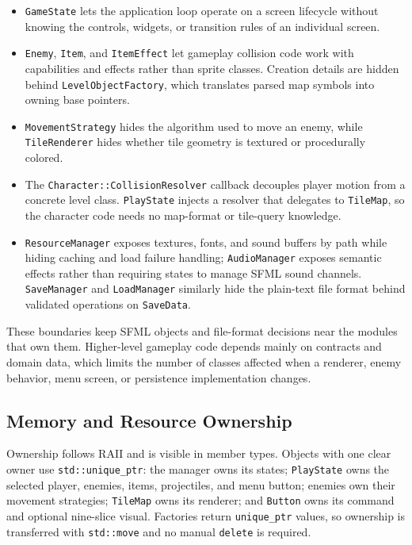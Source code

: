 \documentclass{template}
\begin{document}
\begin{itemize}
    \item \texttt{GameState} lets the application loop operate on a screen
          lifecycle without knowing the controls, widgets, or transition rules
          of an individual screen.
    \item \texttt{Enemy}, \texttt{Item}, and \texttt{ItemEffect} let gameplay
          collision code work with capabilities and effects rather than sprite
          classes. Creation details are hidden behind
          \texttt{LevelObjectFactory}, which translates parsed map symbols into
          owning base pointers.
    \item \texttt{MovementStrategy} hides the algorithm used to move an enemy,
          while \texttt{TileRenderer} hides whether tile geometry is textured
          or procedurally colored.
    \item The \texttt{Character::CollisionResolver} callback decouples player
          motion from a concrete level class. \texttt{PlayState} injects a
          resolver that delegates to \texttt{TileMap}, so the character code
          needs no map-format or tile-query knowledge.
    \item \texttt{ResourceManager} exposes textures, fonts, and sound buffers
          by path while hiding caching and load failure handling;
          \texttt{AudioManager} exposes semantic effects rather than requiring
          states to manage SFML sound channels. \texttt{SaveManager} and
          \texttt{LoadManager} similarly hide the plain-text file format behind
          validated operations on \texttt{SaveData}.
\end{itemize}

These boundaries keep SFML objects and file-format decisions near the modules
that own them. Higher-level gameplay code depends mainly on contracts and
domain data, which limits the number of classes affected when a renderer,
enemy behavior, menu screen, or persistence implementation changes.

\subsection{Memory and Resource Ownership}

Ownership follows RAII and is visible in member types. Objects with one clear
owner use \texttt{std::unique\_ptr}: the manager owns its states;
\texttt{PlayState} owns the selected player, enemies, items, projectiles, and
menu button; enemies own their movement strategies; \texttt{TileMap} owns its
renderer; and \texttt{Button} owns its command and optional nine-slice visual.
Factories return \texttt{unique\_ptr} values, so ownership is transferred with
\texttt{std::move} and no manual \texttt{delete} is required.
\end{document}
